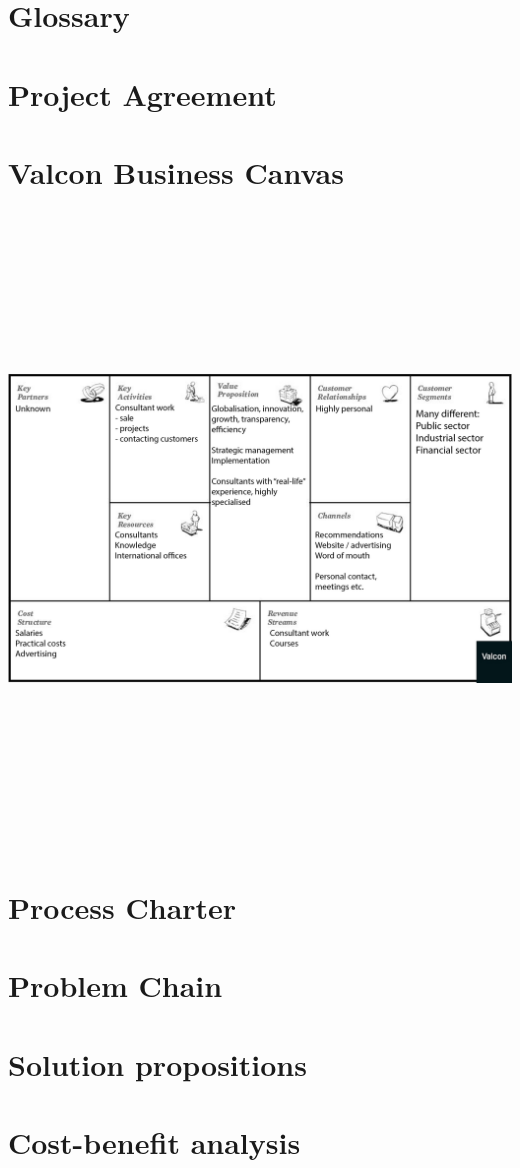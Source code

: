 \chapter{Glossary}

\chapter{Project Agreement}

\chapter{Valcon Business Canvas}
\includegraphics[angle=90,height=475pt]{inline/business-model-canvas.png}
\chapter{Process Charter}

\chapter{Problem Chain}

\chapter{Solution propositions}

\chapter{Cost-benefit analysis}

